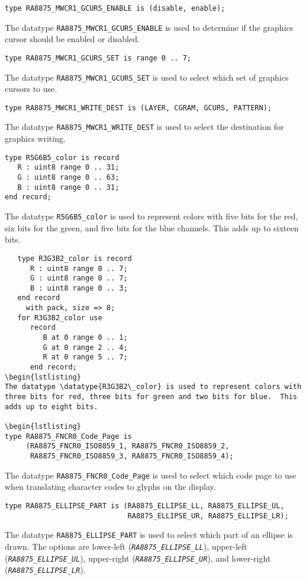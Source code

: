 \documentclass[10pt, openany]{book}
\newcommand{\constant}[1]{\emph{\texttt{#1}}}
\newcommand{\datatype}[1]{\texttt{#1}}
\begin{document}
\begin{lstlisting}
type RA8875_MWCR1_GCURS_ENABLE is (disable, enable);
\end{lstlisting}
The datatype \datatype{RA8875\_MWCR1\_GCURS\_ENABLE} is used to determine if the graphics cursor should be enabled or disabled.

\begin{lstlisting}
type RA8875_MWCR1_GCURS_SET is range 0 .. 7;
\end{lstlisting}
The datatype \datatype{RA8875\_MWCR1\_GCURS\_SET} is used to select which set of graphics cursors to use.

\begin{lstlisting}
type RA8875_MWCR1_WRITE_DEST is (LAYER, CGRAM, GCURS, PATTERN);
\end{lstlisting}
The datatype \datatype{RA8875\_MWCR1\_WRITE\_DEST} is used to select the destination for graphics writing.

\begin{lstlisting}
type R5G6B5_color is record
   R : uint8 range 0 .. 31;
   G : uint8 range 0 .. 63;
   B : uint8 range 0 .. 31;
end record;
\end{lstlisting}
The datatype \datatype{R5G6B5\_color} is used to represent colors with five bits for the red, six bits for the green, and five bits for the blue channels.  This adds up to sixteen bits.

\begin{lstlisting}
   type R3G3B2_color is record
      R : uint8 range 0 .. 7;
      G : uint8 range 0 .. 7;
      B : uint8 range 0 .. 3;
   end record
     with pack, size => 8;
   for R3G3B2_color use
      record
         B at 0 range 0 .. 1;
         G at 0 range 2 .. 4;
         R at 0 range 5 .. 7;
      end record;
\begin{lstlisting}
The datatype \datatype{R3G3B2\_color} is used to represent colors with three bits for red, three bits for green and two bits for blue.  This adds up to eight bits.

\begin{lstlisting}
type RA8875_FNCR0_Code_Page is
     (RA8875_FNCR0_ISO8859_1, RA8875_FNCR0_ISO8859_2,
      RA8875_FNCR0_ISO8859_3, RA8875_FNCR0_ISO8859_4);
\end{lstlisting}
The datatype \datatype{RA8875\_FNCR0\_Code\_Page} is used to select which code page to use when translating character codes to glyphs on the display.

\begin{lstlisting}
type RA8875_ELLIPSE_PART is (RA8875_ELLIPSE_LL, RA8875_ELLIPSE_UL,
                             RA8875_ELLIPSE_UR, RA8875_ELLIPSE_LR);
\end{lstlisting}
The datatype \datatype{RA8875\_ELLIPSE\_PART} is used to select which part of an ellipse is drawn.  The options are lower-left (\constant{RA8875\_ELLIPSE\_LL}), upper-left (\constant{RA8875\_ELLIPSE\_UL}), upper-right (\constant{RA8875\_ELLIPSE\_UR}), and lower-right (\constant{RA8875\_ELLIPSE\_LR}).
\end{document}
